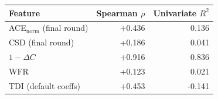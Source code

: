 \begin{tabular}{lrr}
\toprule
Feature & Spearman $\rho$ & Univariate $R^2$ \\
\midrule
ACE$_{\mathrm{norm}}$ (final round) & +0.436 & 0.136 \\
CSD (final round) & +0.186 & 0.041 \\
$1 - \Delta C$ & +0.916 & 0.836 \\
WFR & +0.123 & 0.021 \\
TDI (default coeffs) & +0.453 & -0.141 \\
\bottomrule
\end{tabular}
